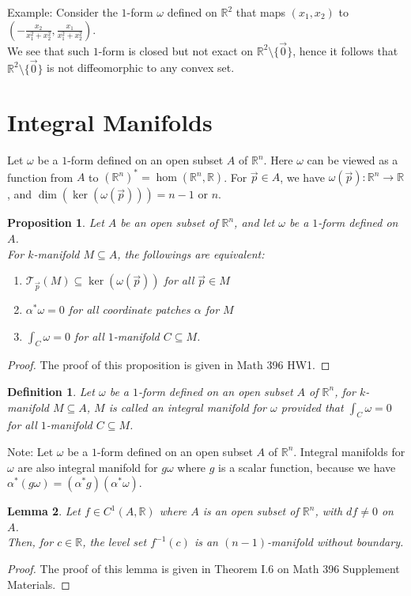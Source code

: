 \documentclass[11pt,oneside]{book}
\theoremstyle{break}
\theoremstyle{break}
\newtheorem{lem}{Lemma}[thm]
\newtheorem{prop}[lem]{Proposition}
\newtheorem{defn}{Definition}[corL]
\newcommand{\R}{\mathbb{R}}
\newcommand{\T}{\mathcal{T}}
\newcommand{\note}{\color{red}Note: \color{black}}
\newcommand{\example}{\color{green}Example: \color{black}}
\begin{document}
\example Consider the $1$-form $\omega $ defined on $\R^2$ that maps $(x_1,x_2)$ to $(-\frac{x_2}{x_1^2+x_2^2} , \frac{x_1}{x_1^2+x_2^2})$.\\
We see that such $1$-form is closed but not exact on $\R^2 \setminus \{\vec{0}\}$, hence it follows that $\R^2 \setminus \{\vec{0}\}$ is not diffeomorphic to any convex set. 


\newpage
\section[Integral Manifolds]{\color{red}Integral Manifolds \color{black}}
Let $\omega$ be a $1$-form defined on an open subset $A$ of $\R^n$. Here $\omega$ can be viewed as a function from $A$ to $(\R^n)^* = \hom(\R^n, \R)$. For $\vec{p}\in A$, we have $\omega(\vec{p}):\R^n \to \R$, and $\dim(\ker(\omega(\vec{p}))) = n-1$ or $n$. 
\begin{prop}
Let $A$ be an open subset of $\R^n$, and let $\omega$ be a $1$-form defined on $A$. \\
For $k$-manifold $M\subseteq A$, the followings are equivalent:
\begin{enumerate}[topsep=3pt,itemsep=-1ex,partopsep=1ex,parsep=1ex]
\item $\T_{\vec{p}}(M) \subseteq \ker(\omega(\vec{p}))$ for all $\vec{p}\in M$
\item $\alpha^*\omega = 0$ for all coordinate patches $\alpha$ for $M$
\item $\int_C \omega =0$ for all $1$-manifold $C\subseteq M$. 
\end{enumerate} 
\end{prop}
\begin{proof}
The proof of this proposition is given in Math 396 HW1. 
\end{proof}

\begin{defn}
Let $\omega$ be a $1$-form defined on an open subset $A$ of $\R^n$, for $k$-manifold $M \subseteq A$, $M$ is called an integral manifold for $\omega$ provided that $\int_C \omega =0$ for all $1$-manifold $C\subseteq M$. 
\end{defn}

\note Let $\omega$ be a $1$-form defined on an open subset $A$ of $\R^n$. Integral manifolds for $\omega$ are also integral manifold for $g\omega$ where $g$ is a scalar function, because we have $\alpha^*(g\omega) = (\alpha^*g)(\alpha^*\omega)$.

\begin{lem}
Let $f \in C^1(A,\R)$ where $A$ is an open subset of $\R^n$, with $df \neq 0$ on $A$. \\Then, for $c \in \R$, the level set $f^{-1}(c)$ is an $(n-1)$-manifold without boundary.
\end{lem}
\begin{proof}
The proof of this lemma is given in Theorem I.6 on Math 396 Supplement Materials. 
\end{proof}
\end{document}
